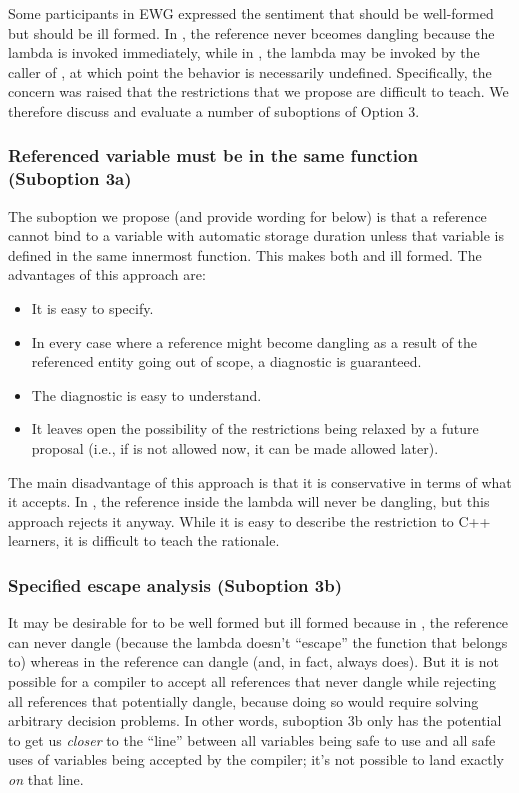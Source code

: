 \documentclass{wg21}
\begin{document}
Some participants in EWG expressed the sentiment that  should be
well-formed but  should be ill formed. In , the reference
 never bceomes dangling because the lambda is invoked immediately,
while in , the lambda may be invoked by the caller of , at
which point the behavior is necessarily undefined. Specifically, the concern was
raised that the restrictions that we propose are difficult to teach. We
therefore discuss and evaluate a number of suboptions of Option 3.

\subsubsection{Referenced variable must be in the same function (Suboption 3a)}
The suboption we propose (and provide wording for below) is that a
 reference cannot bind to a variable with automatic storage
duration unless that variable is defined in the same innermost function. This
makes both  and  ill formed. The advantages of this approach
are:
\begin{itemize}
\item It is easy to specify.
\item In every case where a  reference might become dangling
as a result of the referenced entity going out of scope, a diagnostic is
guaranteed.
\item The diagnostic is easy to understand.
\item It leaves open the possibility of the restrictions being relaxed by a
future proposal (i.e., if  is not allowed now, it can be made allowed
later).
\end{itemize}
The main disadvantage of this approach is that it is conservative in terms of
what it accepts. In , the reference inside the lambda will never be
dangling, but this approach rejects it anyway. While it is easy to describe the
restriction to C++ learners, it is difficult to teach the rationale.

\subsubsection{Specified escape analysis (Suboption 3b)}
It may be desirable for  to be well formed but  ill formed
because in , the  reference can never dangle (because
the lambda doesn't ``escape'' the function that  belongs to) whereas in
 the reference can dangle (and, in fact, always does). But it is not
possible for a compiler to accept all  references that never
dangle while rejecting all  references that potentially dangle,
because doing so would require solving arbitrary decision problems. In other
words, suboption 3b only has the potential to get us \emph{closer} to the
``line'' between all  variables being safe to use and all safe
uses of  variables being accepted by the compiler; it's not
possible to land exactly \emph{on} that line.
\end{document}
